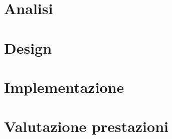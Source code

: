 \documentclass{article}
\begin{document}
	
	\tableofcontents
	\newpage
	
	\section{Analisi}
	
	\section{Design}
	
	\section{Implementazione}
	
	\section{Valutazione prestazioni}
\end{document}
